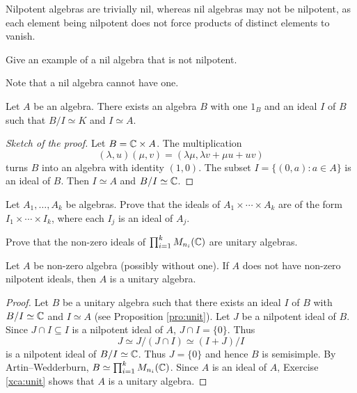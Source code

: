 Nilpotent algebras are trivially nil, whereas nil algebras may not be nilpotent, as each element being nilpotent does not force products of distinct elements to vanish.

\begin{exercise}
    Give an example of a nil algebra that is not nilpotent. 
\end{exercise}

Note that a nil algebra cannot have one. 

\begin{proposition}
\label{pro:unit}
    Let $A$ be an algebra. There exists an algebra $B$ 
    with one $1_B$ and an ideal $I$ of $B$ 
    such that $B/I\simeq K$ and $I\simeq A$. 
\end{proposition}

\begin{proof}[Sketch of the proof]
    Let $B=\mathbb{C}\times A$. The multiplication  
    \[
    (\lambda,u)(\mu,v)=(\lambda\mu,\lambda v+\mu u+uv)
    \]
    turns $B$ into an algebra with identity $(1,0)$. The subset
    $I=\{(0,a):a\in A\}$ is an ideal of $B$. Then $I\simeq A$ 
    and $B/I\simeq\mathbb{C}$. 
\end{proof}

\begin{exercise}
Let $A_1,\dots,A_k$ be algebras. 
Prove that the ideals of $A_1\times\cdots\times A_k$ 
are of the form $I_1\times\cdots\times I_k$, where
each $I_j$ is an ideal of $A_j$.  
\end{exercise}

\begin{exercise}
\label{xca:unit}
    Prove that the non-zero ideals of 
    $\prod_{i=1}^k M_{n_i}(\mathbb{C})$ are unitary algebras.  
\end{exercise}

\begin{proposition}
    Let $A$ be non-zero algebra (possibly without one). If $A$ 
    does not have non-zero nilpotent ideals, 
    then $A$ is a unitary algebra. 
\end{proposition}

\begin{proof}
    Let $B$ be a unitary algebra such that there exists
    an ideal $I$ of $B$ with $B/I\simeq\mathbb{C}$ and $I\simeq A$ 
    (see Proposition \ref{pro:unit}). Let $J$ be 
    a nilpotent ideal of $B$. Since $J\cap I\subseteq I$ is a nilpotent
    ideal of $A$, 
    $J\cap I=\{0\}$. Thus 
    \[
    J\simeq J/(J\cap I)\simeq (I+J)/I
    \]
    is a nilpotent ideal of $B/I\simeq\mathbb{C}$. Thus $J=\{0\}$ 
    and hence $B$ is semisimple. By Artin--Wedderburn, 
    $B\simeq\prod_{i=1}^k M_{n_i}(\mathbb{C})$. Since $A$ 
    is an ideal of $A$, Exercise \ref{xca:unit} shows
    that $A$ is a unitary algebra. 
\end{proof}

